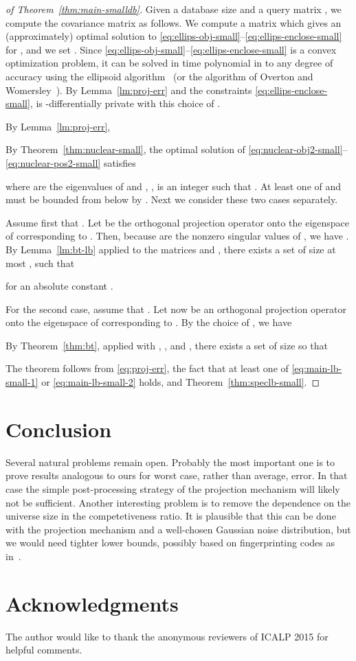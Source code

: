 \documentclass{article}
\begin{document}
\begin{proof}[of Theorem~\ref{thm:main-smalldb}]
  Given a database size  and a query matrix , we compute the
  covariance matrix  as follows. We compute a matrix  which
  gives an (approximately) optimal solution to
  \eqref{eq:ellips-obj-small}--\eqref{eq:ellips-enclose-small} for  , and we
  set . Since
  \eqref{eq:ellips-obj-small}--\eqref{eq:ellips-enclose-small} is a
  convex optimization problem, it can be solved in time polynomial in
   to any degree of accuracy using the ellipsoid
  algorithm~\cite{GLS-ellipsoid} (or the algorithm of Overton and
  Womersley~\cite{OvertonW93-kyfan}). By Lemma~\ref{lm:proj-err} and
  the constraints \eqref{eq:ellips-enclose-small},
   is -differentially
  private with this choice of .

  By Lemma~\ref{lm:proj-err},
  
  By Theorem~\ref{thm:nuclear-small}, the optimal solution  of
  \eqref{eq:nuclear-obj2-small}--\eqref{eq:nuclear-pos2-small}
  satisfies
  
  where  are the eigenvalues
  of  and , , is an integer such that . At least one of  and  must be bounded from below by
  . Next we consider these two cases separately.

  Assume first that . Let  be the orthogonal projection
  operator onto the eigenspace of 
  corresponding to . Then, because
   are the nonzero singular
  values of , we have . By Lemma~\ref{lm:bt-lb} applied to
  the matrices  and , there exists a set  of size at most ,
  such that
  
  for an absolute constant .

  For the second case, assume that . Let  now be an orthogonal
  projection operator onto the eigenspace of  corresponding
  to . By the choice of , we
  have
  
  By Theorem~\ref{thm:bt}, applied with , , and
  , there exists a set  of size
   so that
  
  The theorem follows from \eqref{eq:proj-err}, the fact that at least
  one of \eqref{eq:main-lb-small-1} or \eqref{eq:main-lb-small-2} holds,
  and Theorem~\ref{thm:speclb-small}. 
\end{proof}

\section{Conclusion}

Several natural problems remain open. Probably the most important one
is to prove results analogous to ours for worst case, rather than
average, error. In that case the simple post-processing strategy of
the projection mechanism will likely not be sufficient. Another
interesting problem is to remove the dependence on the universe size
in the competetiveness ratio. It is plausible that this can be done
with the projection mechanism and a well-chosen Gaussian noise
distribution, but we would need tighter lower bounds, possibly based
on fingerprinting codes as in~\cite{BunUV13}.

\section*{Acknowledgments}
The author would like to thank the anonymous reviewers of ICALP 2015 for helpful comments.



\end{document}
